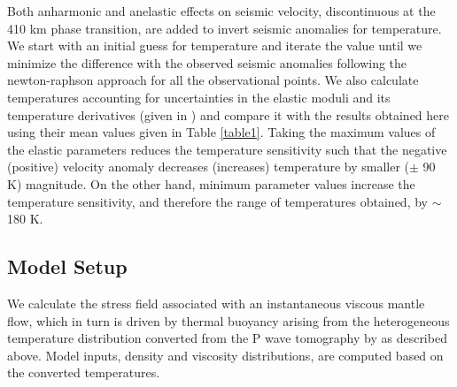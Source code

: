 \documentclass[draft,linenumbers]{agujournal2018}
\begin{document}
Both anharmonic and anelastic effects on seismic velocity, discontinuous at the 410 km phase transition, are added to invert seismic anomalies for temperature. We start with an initial guess for temperature and iterate the value until we minimize the difference with the observed seismic anomalies following the newton-raphson approach for all the observational points. We also calculate temperatures accounting for uncertainties in the elastic moduli and its temperature derivatives (given in \citet{Cammarano2003}) and compare it with the results obtained here using their mean values given in Table \ref{table1}. Taking the maximum values of the elastic parameters reduces the temperature sensitivity such that the negative (positive) velocity anomaly decreases (increases) temperature by smaller ($\pm$ 90 K) magnitude. On the other hand, minimum parameter values increase the temperature sensitivity, and therefore the range of temperatures obtained, by $\sim$ 180 K. 

\subsection{Model Setup}
    We calculate the stress field associated with an instantaneous viscous mantle flow, which in turn is driven by thermal buoyancy arising from the heterogeneous temperature distribution converted from the P wave tomography by \citet{Biryol_2016} as described above. Model inputs, density and viscosity distributions, are computed based on the converted temperatures. 
    
\end{document}
